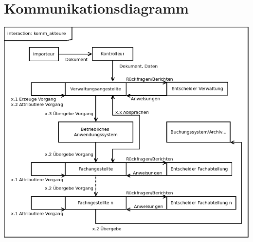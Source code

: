 \documentclass[11pt,oneside,a4paper,notitlepage]{article}
\begin{document}
\section{Kommunikationsdiagramm}

\includegraphics[width=\textwidth]{EISWS1516Howe_Kommunikation_deskriptiv.png}
\noindent
\end{document}
